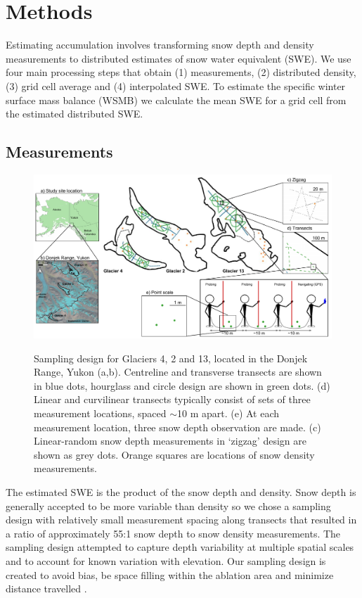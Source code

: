 \documentclass[review,oneside, letterpaper]{igs}
\begin{document}


\section{Methods}

Estimating accumulation involves transforming snow depth and density measurements to distributed estimates of snow water equivalent (SWE). We use four main processing steps that obtain (1) measurements, (2) distributed density, (3) grid cell average and (4) interpolated SWE. To estimate the specific winter surface mass balance (WSMB) we calculate the mean SWE for a grid cell from the estimated distributed SWE. 

\subsection{Measurements}

\begin{figure}
	\centering
	\includegraphics[width =\textwidth]{Sampling.pdf}\\
	\caption{Sampling design for Glaciers 4, 2 and 13, located in the Donjek Range, Yukon (a,b). Centreline and transverse transects are shown in blue dots, hourglass and circle design are shown in green dots. (d) Linear and curvilinear transects typically consist of sets of three measurement locations, spaced $\sim$10 m apart. (e) At each measurement location, three snow depth observation are made. (c) Linear-random snow depth measurements in `zigzag' design are shown as grey dots. Orange squares are locations of snow density measurements. }
	\label{fig:Sampling}
\end{figure}

The estimated SWE is the product of the snow depth and density. Snow depth is generally accepted to be more variable than density \citep{Elder1991, Clark2011, Lopez2013} so we chose a sampling design with relatively small measurement spacing along transects that resulted in a ratio of approximately 55:1 snow depth to snow density measurements. The sampling design attempted to capture depth variability at multiple spatial scales and to account for known variation with elevation. Our sampling design is created to avoid bias, be space filling within the ablation area and minimize distance travelled \citep{Shea2010}.
\end{document}
